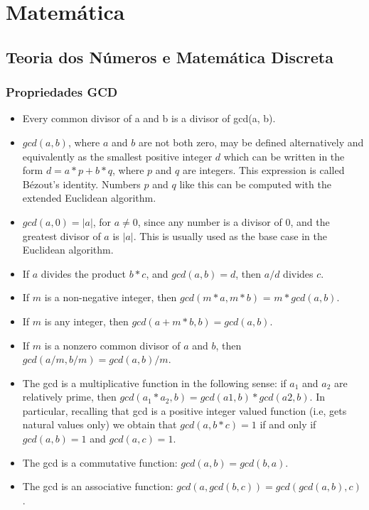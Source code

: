 \section{Matemática}

\subsection{Teoria dos Números e Matemática Discreta}

\subsubsection{Propriedades GCD}
  \begin{itemize}
    \item Every common divisor of a and b is a divisor of gcd(a, b).
    \item $gcd(a, b)$, where $a$ and $b$ are not both zero, may be defined alternatively and equivalently as the smallest positive integer $d$ which can be written in the form $d = a*p + b*q$, where $p$ and $q$ are integers. This expression is called Bézout's identity. Numbers $p$ and $q$ like this can be computed with the extended Euclidean algorithm.
    \item $gcd(a, 0) = |a|$, for $a \neq 0$, since any number is a divisor of $0$, and the greatest divisor of $a$ is $|a|$. This is usually used as the base case in the Euclidean algorithm.
    \item If $a$ divides the product $b*c$, and $gcd(a, b) = d$, then $a/d$ divides $c$.
    \item If $m$ is a non-negative integer, then $gcd(m*a, m*b)$ = $m*gcd(a, b)$.
    \item If $m$ is any integer, then $gcd(a + m*b, b) = gcd(a, b)$.
    \item If $m$ is a nonzero common divisor of $a$ and $b$, then $gcd(a/m, b/m) = gcd(a, b)/m$.
    \item The gcd is a multiplicative function in the following sense: if $a_1$ and $a_2$ are relatively prime, then $gcd(a_1*a_2, b) = gcd(a1, b)*gcd(a2, b)$. In particular, recalling that gcd is a positive integer valued function (i.e, gets natural values only) we obtain that $gcd(a, b*c) = 1$ if and only if $gcd(a, b) = 1$ and $gcd(a, c) = 1$.
    \item The gcd is a commutative function: $gcd(a, b) = gcd(b, a)$.
    \item The gcd is an associative function: $gcd(a, gcd(b, c)) = gcd(gcd(a, b), c)$.

\end{itemize}
